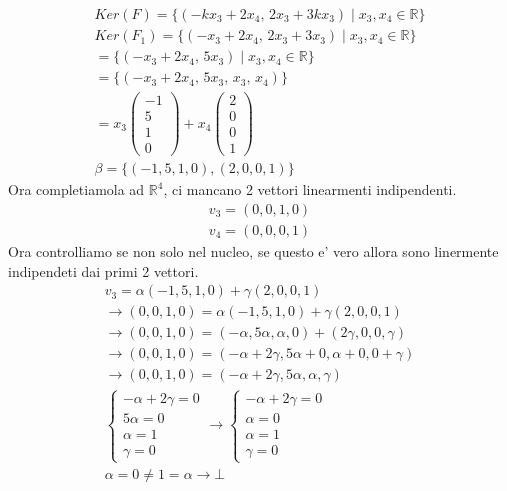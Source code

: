 \documentclass{article}
\begin{document}
\begin{align*}
    Ker(F)=\{(-kx_3+2x_4, \, 2x_3+3kx_3) \mid x_3,x_4 \in \mathbb{R}\} \\
    Ker(F_1)=\{(-x_3+2x_4, \, 2x_3+3x_3) \mid x_3,x_4 \in \mathbb{R}\} \\
    = \{(-x_3+2x_4, \, 5x_3) \mid x_3,x_4 \in \mathbb{R}\} \\
    = \{(-x_3+2x_4, \, 5x_3, \, x_3, \, x_4)\}
    \\= x_3\begin{pmatrix}
        -1 \\ 5 \\ 1 \\0
    \end{pmatrix}
    +x_4\begin{pmatrix}
        2 \\ 0 \\ 0 \\1
    \end{pmatrix}
    \\ \beta=\{(-1,5,1,0),(2,0,0,1)\}
\end{align*}
Ora completiamola ad $\mathbb{R}^4$, ci mancano 2 vettori linearmenti indipendenti.
\begin{align*}
    v_3=(0,0,1,0) \\
    v_4=(0,0,0,1)
\end{align*}
Ora controlliamo se non solo nel nucleo, se questo e' vero allora sono linermente indipendeti dai primi 2 vettori.
\begin{align*}
    v_3=\alpha(-1,5,1,0)+\gamma(2,0,0,1) \\
    \to (0,0,1,0)=\alpha(-1,5,1,0)+\gamma(2,0,0,1) \\
    \to (0,0,1,0)=(-\alpha,5\alpha,\alpha,0)+(2\gamma,0,0,\gamma) \\
    \to (0,0,1,0)=(-\alpha+2\gamma,5\alpha+0,\alpha+0,0+\gamma) \\
    \to (0,0,1,0)=(-\alpha+2\gamma,5\alpha,\alpha,\gamma) \\
    \begin{cases}
        -\alpha+2\gamma=0 \\
        5\alpha=0 \\
        \alpha=1 \\
        \gamma=0
    \end{cases} \to     \begin{cases}
        -\alpha+2\gamma=0 \\
        \alpha=0 \\
        \alpha=1 \\
        \gamma=0
    \end{cases}
    \\ \alpha=0\neq1=\alpha \to \bot
\end{align*}
\end{document}
